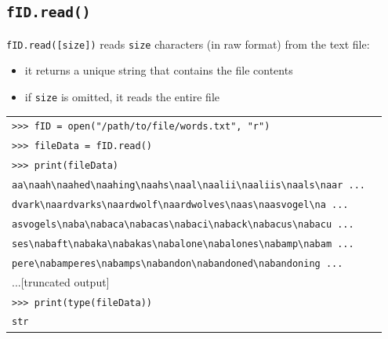 \documentclass[t,handout,9pt]{beamer}
\begin{document}
\subsection{\texttt{fID.read()}}
\begin{frame}
\vfill
\texttt{fID.read([size])} reads \texttt{size} characters (in raw format) from the text file:
\begin{itemize}
	\item it returns a unique string that contains the file contents
	\item if \texttt{size} is omitted, it reads the entire file
\end{itemize}
\begin{table}[]
\begin{flushleft}
\begin{tabular}{ll}
\texttt{>{}>{}> fID = open("/path/to/file/words.txt", "r")} &  \\
\texttt{>{}>{}> fileData = fID.read()} &  \\
\texttt{>{}>{}> print(fileData)} &  \\
\texttt{aa\textbackslash naah\textbackslash naahed\textbackslash naahing\textbackslash naahs\textbackslash naal\textbackslash naalii\textbackslash naaliis\textbackslash naals\textbackslash naar ...} &  \\
\texttt{dvark\textbackslash naardvarks\textbackslash naardwolf\textbackslash naardwolves\textbackslash naas\textbackslash naasvogel\textbackslash na ...} &  \\
\texttt{asvogels\textbackslash naba\textbackslash nabaca\textbackslash nabacas\textbackslash nabaci\textbackslash naback\textbackslash nabacus\textbackslash nabacu ...} &  \\
\texttt{ses\textbackslash nabaft\textbackslash nabaka\textbackslash nabakas\textbackslash nabalone\textbackslash nabalones\textbackslash nabamp\textbackslash nabam ...} &  \\
\texttt{pere\textbackslash nabamperes\textbackslash nabamps\textbackslash nabandon\textbackslash nabandoned\textbackslash nabandoning ...} &  \\
...[truncated output] &  \\
\texttt{>{}>{}> print(type(fileData))} &  \\
\texttt{str} &  \\
\end{tabular}
\end{flushleft}
\end{table}
\vfill
\end{frame}
\end{document}
